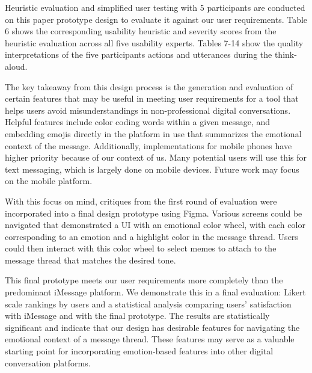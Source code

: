 \documentclass[acmsmall,screen,authorversion,nonacm]{acmart}
\begin{document}
Heuristic evaluation and simplified user testing with 5 participants are conducted on this paper prototype design to evaluate it against our user requirements. Table 6 shows the corresponding usability heuristic and severity scores from the heuristic evaluation across all five usability experts. Tables 7-14 show the quality interpretations of the five participants actions and utterances during the think-aloud. 

The key takeaway from this design process is the generation and evaluation of certain features that may be useful in meeting user requirements for a tool that helps users avoid misunderstandings in non-professional digital conversations. Helpful features include color coding words within a given message, and embedding emojis directly in the platform in use that summarizes the emotional context of the message. Additionally, implementations for mobile phones have higher priority because of our context of us. Many potential users will use this for text messaging, which is largely done on mobile devices. Future work may focus on the mobile platform.

With this focus on mind, critiques from the first round of evaluation were incorporated into a final design prototype using Figma. Various screens could be navigated that demonstrated a UI with an emotional color wheel, with each color corresponding to an emotion and a highlight color in the message thread. Users could then interact with this color wheel to select memes to attach to the message thread that matches the desired tone. 

This final prototype meets our user requirements more completely than the predominant iMessage platform. We demonstrate this in a final evaluation: Likert scale rankings by users and a statistical analysis comparing users' satisfaction with iMessage and with the final prototype. The results are statistically significant and indicate that our design has desirable features for navigating the emotional context of a message thread. These features may serve as a valuable starting point for incorporating emotion-based features into other digital conversation platforms.

\end{document}

